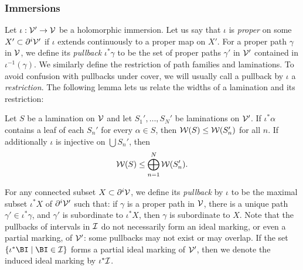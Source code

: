 \documentclass[12pt]{amsart}
\begin{document}
\subsubsection{Immersions}
Let $\iota: \mathcal V'\to \mathcal V$ be a holomorphic immersion. 
Let us say that $\iota$ is \emph{proper} on some $X'\subset \partial^i\mathcal V'$ if $\iota$ extends continuously to a proper map on $X'$.
For a proper path $\gamma$ in $\mathcal V$, we define its \emph{pullback} $\iota^*\gamma$ to be the set of proper paths $\gamma'$ in $\mathcal V'$ contained in $\iota^{-1}(\gamma)$. 
We similarly define the restriction of path families  and laminations. To avoid confusion with pullbacks under cover, we will usually call a pullback by $\iota$ a \emph{restriction}.
The following lemma lets us relate the widths of a lamination and its restriction:
\begin{lemma}\label{lem:domination}
	Let $S$ be a lamination on $\mathcal V$ and let $S_1', \dots, S_N'$ be laminations on $\mathcal V'$. If $\iota^*\alpha$ contains a leaf of each  $S_n'$ for every $\alpha\in S$, then 
	$\mathcal W(S)\leq \mathcal W(S_n')$ for all $n$. If additionally $\iota$ is injective on $\bigcup S_n'$, then 
	$$\mathcal W(S) \leq \bigoplus_{n=1}^N\mathcal W(S_n').$$
\end{lemma}

For any connected subset $X\subset \partial^i\mathcal V$,  we define its \emph{pullback} by $\iota$ to be the maximal subset $\iota^*X$ of $\partial^i\mathcal V'$ such that: if $\gamma$ is a proper path in $\mathcal V$, there is a unique path $\gamma'\in \iota^*\gamma$, and $\gamma'$ is subordinate to $\iota^*X$, then $\gamma$ is subordinate to $X$.
Note that the pullbacks of intervals in $\mathcal I$ do not necessarily form an ideal marking, or even a partial marking, of $\mathcal V'$: some pullbacks may not exist or may overlap. If the set $\setofst{\iota^*\BI}{\BI\in \II}$
forms a partial ideal marking of $\mathcal V'$, then we denote the induced ideal marking by $\iota^*\mathcal I$. 
\end{document}

